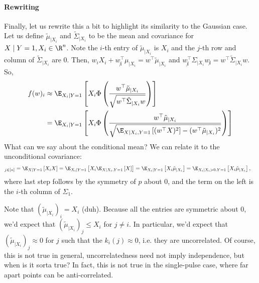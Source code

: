 \documentclass{article}
\begin{document}
\paragraph*{Rewriting}
Finally, let us rewrite this a bit to highlight its similarity to the Gaussian case.
Let us define $\tilde{\mu}_{\mid X_i}$ and $\tilde{\Sigma}_{\mid X_i}$ to be the mean and covariance for $X \mid Y = 1, X_i \in \R^n$.
Note the $i$-th entry of $\tilde{\mu}_{\mid X_i}$ is $X_i$ and the $j$-th row and column of $\tilde{\Sigma}_{\mid X_i}$ are 0.
Then, $w_i X_i + w_{\not i}^\top \mu_{\mid X_i} = w^\top \tilde{\mu}_{\mid X_i}$ and $w_{\not i}^\top \Sigma_{\mid X_i} w_{\not i} = w^\top \tilde{\Sigma}_{\mid X_i} w$.
So,
\begin{align}
  f(w)_i 
  &\approx \E_{X_i \mid Y=1} \left[ X_i \Phi\left( \frac{ w^\top \tilde{\mu}_{\mid X_i} }{ \sqrt{ w^\top \tilde{\Sigma}_{\mid X_i} w } } \right) \right] \label{eq:fwi_collapsed} \\
  &= \E_{X_i \mid Y=1} \left[ X_i \Phi\left( \frac{ w^\top \tilde{\mu}_{\mid X_i} }{ \sqrt{ \E_{X \mid X_i, Y=1} \left[ (w^\top X)^2 \right] - (w^\top \tilde{\mu}_{\mid X_i})^2 } } \right) \right]
\end{align}
What can we say about the conditional mean?
We can relate it to the unconditional covariance:
\begin{align*}
  [(\Sigma_1)_{ji} ]_{j\in[n]}
  &= \E_{X \mid Y=1} \left[ X_i X \right]
  = \E_{X_i \mid Y=1} \left[ X_i \E_{X \mid X_i, Y=1} \left[ X \right] \right]
  = \E_{X_i \mid Y=1} \left[ X_i \tilde{\mu}_{\mid X_i} \right]
  = \E_{X_i \mid X_i > 0, Y=1} \left[ X_i \tilde{\mu}_{\mid X_i} \right],
\end{align*}
where last step follows by the symmetry of $p$ about 0, and the term on the left is the $i$-th column of $\Sigma_1$.

Note that $(\tilde{\mu}_{\mid X_i})_i = X_i$ (duh).
Because all the entries are symmetric about 0, we'd expect that $(\tilde{\mu}_{\mid X_i})_j \leq X_i$ for $j \neq i$.
In particular, we'd expect that $(\tilde{\mu}_{\mid X_i})_j \approx 0$ for $j$ such that the $k_i(j) \approx 0$, i.e. they are uncorrelated.
Of course, this is not true in general, uncorrelatedness need not imply independence, but when is it sorta true?
In fact, this is not true in the single-pulse case, where far apart points can be anti-correlated.
\end{document}
